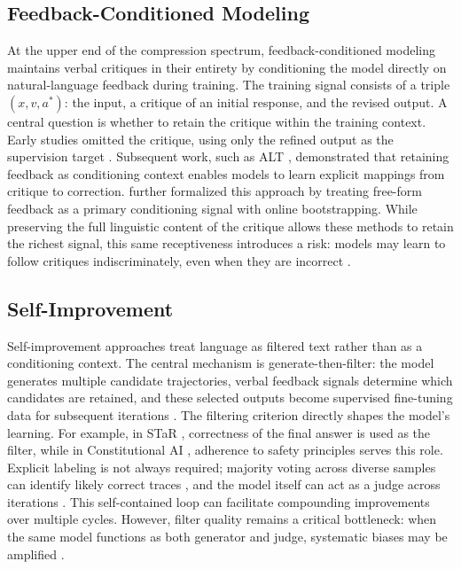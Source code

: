 \subsection{Feedback-Conditioned Modeling}%
\label{sec:feedback-conditioned}



At the upper end of the compression spectrum, feedback-conditioned modeling maintains verbal critiques in their entirety by conditioning the model directly on natural-language feedback during training. The training signal consists of a triple $(x, v, a^*)$: the input, a critique of an initial response, and the revised output. A central question is whether to retain the critique within the training context. Early studies omitted the critique, using only the refined output as the supervision target \citep{scheurer2023training}. Subsequent work, such as ALT \citep{lloret2024towards}, demonstrated that retaining feedback as conditioning context enables models to learn explicit mappings from critique to correction. \citet{luo2025fcp} further formalized this approach by treating free-form feedback as a primary conditioning signal with online bootstrapping. While preserving the full linguistic content of the critique allows these methods to retain the richest signal, this same receptiveness introduces a risk: models may learn to follow critiques indiscriminately, even when they are incorrect \citep{sharma2024towards}.

 



\subsection{Self-Improvement}
\label{sec:self-improvement}
Self-improvement approaches treat language as filtered text rather than as a conditioning context. The central mechanism is generate-then-filter: the model generates multiple candidate trajectories, verbal feedback signals determine which candidates are retained, and these selected outputs become supervised fine-tuning data for subsequent iterations \citep{singh2023beyond}. The filtering criterion directly shapes the model's learning. For example, in STaR \citep{zelikman2022star}, correctness of the final answer is used as the filter, while in Constitutional AI \citep{bai2022constitutional}, adherence to safety principles serves this role. Explicit labeling is not always required; majority voting across diverse samples can identify likely correct traces \citep{huang2022selfimprove}, and the model itself can act as a judge across iterations \citep{yuan2024self}. This self-contained loop can facilitate compounding improvements over multiple cycles. However, filter quality remains a critical bottleneck: when the same model functions as both generator and judge, systematic biases may be amplified \citep{shumailov2023curse}.




